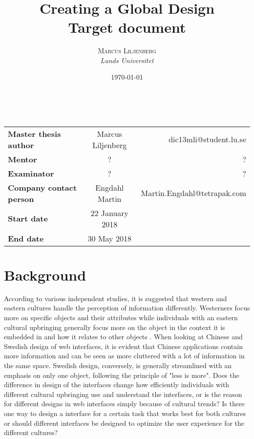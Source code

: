\documentclass[a4paper, 11pt]{article} %
\title{\textbf{Creating a Global Design}\\ %
	Target document} %
\author{\textsc{Marcus Liljenberg} %
	\\{\textit{Lunds Universitet}}} %
\date{\today} %
\makeatletter
\renewcommand{\maketitle}{ %
	\begin{flushright} %
		{\LARGE\@title} %
		
		\vspace{50pt} %
		
		{\large\@author} %
		\\\@date %
		
		\vspace{40pt} %
	\end{flushright}
}
\makeatother
\begin{document}
	
	
	\maketitle %
	
	
	\begin{adjustwidth}{-0.2cm}{}
	\setlength\tabcolsep{2pt}
	\begin{tabular}{ l c r }
		\textbf{Master thesis author} & Marcus Liljenberg & dic13mli@student.lu.se \\
		\textbf{Mentor} & ? & ? \\
		\textbf{Examinator} & ? & ? \\
		\textbf{Company contact person} & Engdahl Martin & Martin.Engdahl@tetrapak.com \\
		\textbf{Start date} & 22 January 2018 &  \\
		\textbf{End date} & 30 May 2018 &  \\
	\end{tabular}
\end{adjustwidth}
	\section*{Background}
	According to various independent studies, it is suggested that western and eastern cultures handle the perception of information differently. Westerners focus more on specific objects and their attributes while individuals with an eastern cultural upbringing generally focus more on the object in the context it is embedded in and how it relates to other objects \cite{Holistic_vs_Analytic}. When looking at Chinese and Swedish design of web interfaces, it is evident that Chinese applications contain more information and can be seen as more cluttered with a lot of information in the same space. Swedish design, conversely, is generally streamlined with an emphasis on only one object, following the principle of "less is more". Does the difference in design of the interfaces change how efficiently individuals with different cultural upbringing use and understand the interfaces, or is the reason for different designs in web interfaces simply because of cultural trends? Is there one way to design a interface for a certain task that works best for both cultures or should different interfaces be designed to optimize the user experience for the different cultures?
	
\end{document}

